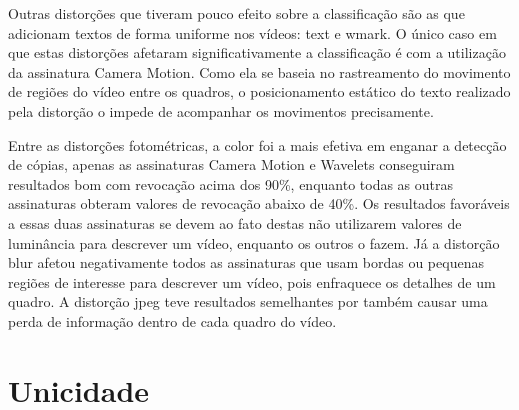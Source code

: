 Outras distorções que tiveram pouco efeito sobre a classificação são as que adicionam textos de forma uniforme nos vídeos: text e wmark. O único caso em que estas distorções afetaram significativamente a classificação é com a utilização da assinatura Camera Motion. Como ela se baseia no rastreamento do movimento de regiões do vídeo entre os quadros, o posicionamento estático do texto realizado pela distorção o impede de acompanhar os movimentos precisamente.

Entre as distorções fotométricas, a color foi a mais efetiva em enganar a detecção de cópias, apenas as assinaturas Camera Motion e Wavelets conseguiram resultados bom com revocação acima dos 90\%, enquanto todas as outras assinaturas obteram valores de revocação abaixo de 40\%. Os resultados favoráveis a essas duas assinaturas se devem ao fato destas não utilizarem valores de luminância para descrever um vídeo, enquanto os outros o fazem. Já a distorção blur afetou negativamente todos as assinaturas que usam bordas ou pequenas regiões de interesse para descrever um vídeo, pois enfraquece os detalhes de um quadro. A distorção jpeg teve resultados semelhantes por também causar uma perda de informação dentro de cada quadro do vídeo. 



\section{Unicidade}


